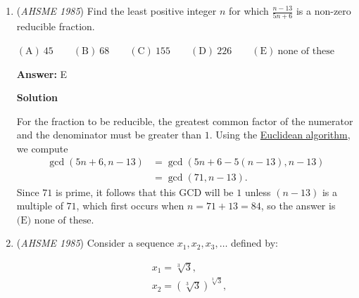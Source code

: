 \begin{enumerate}
\textbf{Solution 2}

Similarly to in Solution 1, we let the dimensions (in cm) be $b$, $br$, and $br^2$, so that the volume condition gives $8 = b^3r^3 = (br)^3$ and thus $br = 2$. The surface area condition now becomes 
 \begin{align*}2(b)(br)+2(br)\left(br^2\right)+2\left(br^2\right)(b) = 32 &\iff b^2r+b^2r^2+b^2r^3 = 16 \\&\iff br\left(b+br+br^2\right) = 16,\end{align*}
 so substituting $br = 2$ from above immediately gives 
 \[b+br+br^2 = \frac{16}{2} = 8,\] and hence, without needing to actually compute the dimensions, we deduce that the sum of the edge lengths (in cm) is 
 \[4b + 4br + 4br^2 = 4(8) = \boxed{\text{(B)} \ 32}.\]



	\item (\textit{AHSME 1985}) Find the least positive integer $n$ for which $\frac{n-13}{5n+6}$ is a non-zero reducible fraction.


 $\mathrm{(A)\ } 45 \qquad \mathrm{(B) \ }68 \qquad \mathrm{(C) \  } 155 \qquad \mathrm{(D) \  } 226 \qquad \mathrm{(E) \  }\text{none of these}$

 \textbf{Answer: }E



\textbf{Solution}

For the fraction to be reducible, the greatest common factor of the numerator and the denominator must be greater than $1$. Using the \href{https://artofproblemsolving.com/wiki/index.php?title=Euclidean\_algorithm}{Euclidean algorithm}, we compute 
 \begin{align*}\gcd\left(5n+6,n-13\right) &= \gcd\left(5n+6-5(n-13),n-13\right) \\ &= \gcd\left(71,n-13\right).\end{align*}
Since $71$ is prime, it follows that this GCD will be $1$ unless $(n-13)$ is a multiple of $71$, which first occurs when $n = 71+13 = 84$, so the answer is $\boxed{\text{(E) none of these}}$.

 


	\item (\textit{AHSME 1985}) Consider a sequence $x_1,x_2,x_3,\dotsc$ defined by:

 \begin{align*}&x_1 = \sqrt[3]{3}, \\ &x_2 = \left(\sqrt[3]{3}\right)^{\sqrt[3]{3}},\end{align*}


\end{enumerate}
